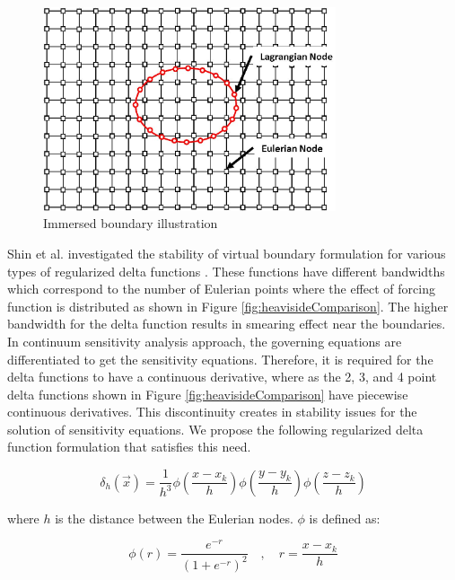 \documentclass[12pt]{aiaa-pretty}
\begin{document}
%
\begin{figure}[H]
	\centering
	\includegraphics[height=6.0cm]{figure/immerdBoundary.jpg}
	\caption{Immersed boundary illustration}
	\label{fig:immersedBoundary}
\end{figure}
%

Shin et al. investigated the stability of virtual boundary formulation for various types of regularized delta functions \cite{shin2008assessment}. These functions have different bandwidths which correspond to the number of Eulerian points where the effect of forcing function is distributed as shown in Figure \ref{fig:heavisideComparison}. The higher bandwidth for the delta function results in smearing effect near the boundaries. In continuum sensitivity analysis approach, the governing equations are differentiated to get the sensitivity equations. Therefore, it is required for the delta functions to have a continuous derivative, where as the 2, 3, and 4 point delta functions shown in Figure \ref{fig:heavisideComparison} have piecewise continuous derivatives. This discontinuity creates in stability issues for the solution of sensitivity equations. We propose the following regularized delta function formulation that satisfies this need.

%
\begin{equation}\label{eq:heavisideFunction}
	\delta_h(\vec{x}) = \frac{1}{h^3} \phi \left( \frac{x - x_k}{h} \right)
									 \phi \left( \frac{y - y_k}{h} \right)
									 \phi \left( \frac{z - z_k}{h} \right)
\end{equation}
%

where $h$ is the distance between the Eulerian nodes. $\phi$ is defined as:

%
\begin{equation}\label{eq:continuousDeltaFunction}
	\phi(r) = \frac{e^{-r}}{\left( 1 + e^{-r} \right)^2} \quad , \quad r = \frac{x - x_k}{h}
\end{equation}
%
\end{document}
